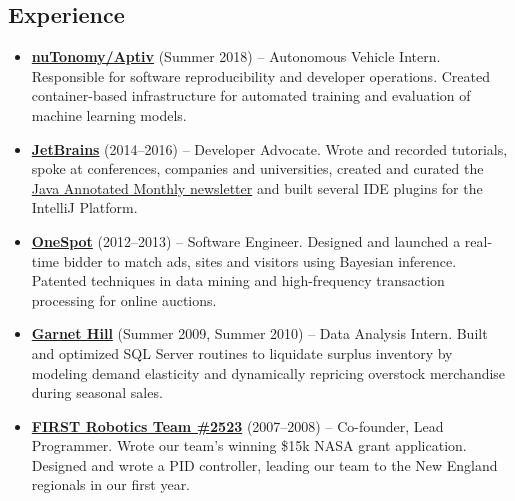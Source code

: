\documentclass[letterpaper,11pt]{article}
\newcommand{\resumeItem}[2]{
  \item\small{\textbf{#1}{ #2 }}
}
\newcommand{\resumeSubItem}[2]{\resumeItem{#1}{#2}}
\newcommand{\resumeSubHeadingListStart}{\begin{itemize}[leftmargin=*]}
\newcommand{\resumeSubHeadingListEnd}{\end{itemize}}
\begin{document}
\begin{justify}
\section{Experience}
\resumeSubHeadingListStart
\resumeSubItem{\href{https://www.aptiv.com/}{nuTonomy/Aptiv}}{(Summer 2018) -- Autonomous Vehicle Intern. Responsible for software reproducibility and developer operations. Created container-based infrastructure for automated training and evaluation of machine learning models.}
\resumeSubItem{\href{https://www.jetbrains.com/}{JetBrains}}{(2014--2016) -- Developer Advocate. Wrote and recorded tutorials, spoke at conferences, companies and universities, created and curated the \href{https://blog.jetbrains.com/idea/tag/java-annotated/}{Java Annotated Monthly newsletter} and built several IDE plugins for the IntelliJ Platform.}
\resumeSubItem{\href{https://www.onespot.com/}{OneSpot}}{(2012--2013) -- Software Engineer. Designed and launched a real-time bidder to match ads, sites and visitors using Bayesian inference. Patented techniques in data mining and high-frequency transaction processing for online auctions.}
\resumeSubItem{\href{https://www.garnethill.com/}{Garnet Hill}}{(Summer 2009, Summer 2010) -- Data Analysis Intern. Built and optimized SQL Server routines to liquidate surplus inventory by modeling demand elasticity and dynamically repricing overstock merchandise during seasonal sales.}
\resumeSubItem{\href{https://www.firstinspires.org/}{FIRST Robotics Team \#2523}}{(2007--2008) -- Co-founder, Lead Programmer. Wrote our team's winning \$15k NASA grant application. Designed and wrote a PID controller, leading our team to the New England regionals in our first year.}
\resumeSubHeadingListEnd


\end{justify}
\end{document}

